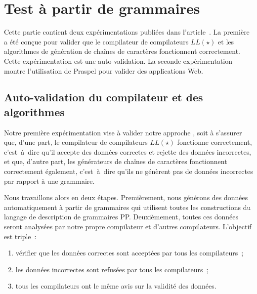 \section{Test à partir de grammaires}
\label{section:experimentation:grammar}

Cette partie contient deux expérimentations publiées dans
l'article~. La première a été conçue pour valider que le
compilateur de compilateurs $LL(\star)$ et les algorithmes de génération de
chaînes de caractères fonctionnent correctement. Cette expérimentation est une
auto-validation. La seconde expérimentation montre l'utilisation de Praspel pour
valider des applications Web.

\subsection{Auto-validation du compilateur et des algorithmes}

Notre première expérimentation vise à valider notre approche
, soit à s'assurer que, d'une part, le
compilateur de compilateurs $LL(\star)$ fonctionne correctement, c'est~à~dire
qu'il accepte des données correctes et rejette des données incorrectes, et que,
d'autre part, les générateurs de chaînes de caractères fonctionnent correctement
également, c'est~à~dire qu'ils ne génèrent pas de données incorrectes par
rapport à une grammaire.

Nous travaillons alors en deux étapes. Premièrement, nous générons des données
automatiquement à partir de grammaires qui utilisent toutes les constructions du
langage de description de grammaires PP. Deuxièmement, toutes ces données seront
analysées par notre propre compilateur et d'autres compilateurs. L'objectif est
triple~:
%
\begin{enumerate}

\item vérifier que les données correctes sont acceptées par tous les
compilateurs~;

\item les données incorrectes sont refusées par tous les compilateurs~;

\item tous les compilateurs ont le même avis sur la validité des données.

\end{enumerate}

